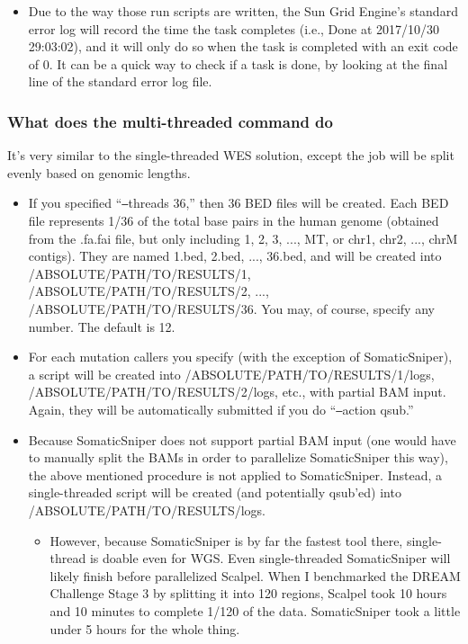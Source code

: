 \documentclass[10pt,letterpaper]{article}
\begin{document}
\begin{sloppypar}
\begin{itemize}
  \item
  Due to the way those run scripts are written, the Sun Grid Engine's standard error log will record the time the task completes (i.e., Done at 2017/10/30 29:03:02), and it will only do so when the task is completed with an exit code of 0. It can be a quick way to check if a task is done, by looking at the final line of the standard error log file.

\end{itemize}



\subsubsection{What does the multi-threaded command do}
It's very similar to the single-threaded WES solution, except the job will be split evenly based on genomic lengths.

\begin{itemize}
  \item
  If you specified ``\texttt{--}threads 36,'' then 36 BED files will be created. Each BED file represents 1/36 of the total base pairs in the human genome (obtained from the .fa.fai file, but only including 1, 2, 3, ..., MT, or chr1, chr2, ..., chrM contigs). They are named 1.bed, 2.bed, ..., 36.bed, and will be created into /ABSOLUTE/PATH/TO/RESULTS/1, /ABSOLUTE/PATH/TO/RESULTS/2, ..., /ABSOLUTE/PATH/TO/RESULTS/36. You may, of course, specify any number. The default is 12.

  \item
  For each mutation callers you specify (with the exception of SomaticSniper), a script will be created into /ABSOLUTE/PATH/TO/RESULTS/1/logs, /ABSOLUTE/PATH/TO/RESULTS/2/logs, etc., with partial BAM input. Again, they will be automatically submitted if you do ``\texttt{--}action qsub.''
  
  \item
  Because SomaticSniper does not support partial BAM input (one would have to manually split the BAMs in order to parallelize SomaticSniper this way), the above mentioned procedure is not applied to SomaticSniper. Instead, a single-threaded script will be created (and potentially qsub'ed) into /ABSOLUTE/PATH/TO/RESULTS/logs.

    \begin{itemize}
    \item However, because SomaticSniper is by far the fastest tool there, single-thread is doable even for WGS. Even single-threaded SomaticSniper will likely finish before parallelized Scalpel. When I benchmarked the DREAM Challenge Stage 3 by splitting it into 120 regions, Scalpel took 10 hours and 10 minutes to complete 1/120 of the data. SomaticSniper took a little under 5 hours for the whole thing.


\end{itemize}
\end{itemize}
\end{sloppypar}
\end{document}
